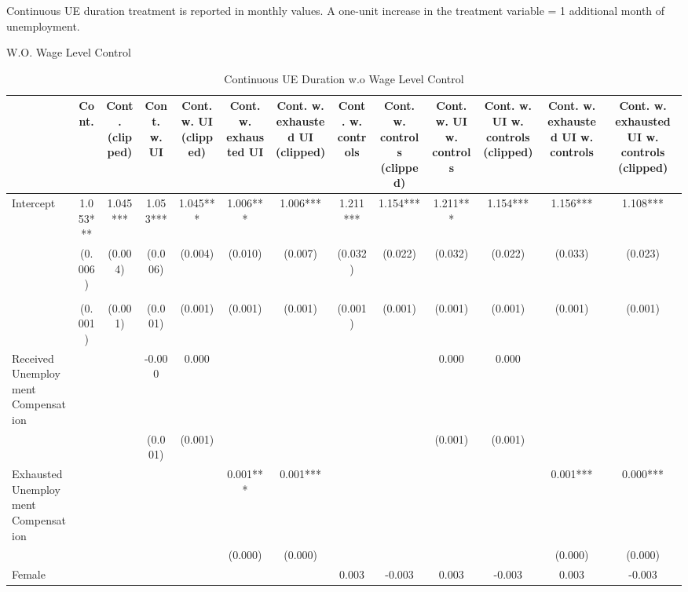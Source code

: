 \documentclass[
]{article}
\begin{document}
Continuous UE duration treatment is reported in monthly values. A
one-unit increase in the treatment variable = 1 additional month of
unemployment.

W.O. Wage Level Control

\begin{table}[t]
\caption{\label{tab:unnamed-chunk-28}Continuous UE Duration w.o Wage Level Control} 
\fontsize{12.0pt}{14.4pt}\selectfont
\begin{tabular*}{\linewidth}{@{\extracolsep{\fill}}lcccccccccccc}
\toprule
  & Cont. & Cont. (clipped) & Cont. w. UI & Cont. w. UI (clipped) & Cont. w. exhausted UI & Cont. w. exhausted UI (clipped) & Cont. w. controls & Cont. w. controls (clipped) & Cont. w. UI w. controls & Cont. w. UI w. controls (clipped) & Cont. w. exhausted UI w. controls & Cont. w. exhausted UI w. controls (clipped) \\ 
\midrule\addlinespace[2.5pt]
Intercept & 1.053*** & 1.045*** & 1.053*** & 1.045*** & 1.006*** & 1.006*** & 1.211*** & 1.154*** & 1.211*** & 1.154*** & 1.156*** & 1.108*** \\ 
 & (0.006) & (0.004) & (0.006) & (0.004) & (0.010) & (0.007) & (0.032) & (0.022) & (0.032) & (0.022) & (0.033) & (0.023) \\ 
{\cellcolor[HTML]{ADD8E6}{Unemployment Duration (Months)}} & {\cellcolor[HTML]{ADD8E6}{-0.007***}} & {\cellcolor[HTML]{ADD8E6}{-0.006***}} & {\cellcolor[HTML]{ADD8E6}{-0.007***}} & {\cellcolor[HTML]{ADD8E6}{-0.006***}} & {\cellcolor[HTML]{ADD8E6}{-0.005***}} & {\cellcolor[HTML]{ADD8E6}{-0.004***}} & {\cellcolor[HTML]{ADD8E6}{-0.006***}} & {\cellcolor[HTML]{ADD8E6}{-0.006***}} & {\cellcolor[HTML]{ADD8E6}{-0.006***}} & {\cellcolor[HTML]{ADD8E6}{-0.006***}} & {\cellcolor[HTML]{ADD8E6}{-0.004***}} & {\cellcolor[HTML]{ADD8E6}{-0.004***}} \\ 
 & (0.001) & (0.001) & (0.001) & (0.001) & (0.001) & (0.001) & (0.001) & (0.001) & (0.001) & (0.001) & (0.001) & (0.001) \\ 
Received Unemployment Compensation &  &  & -0.000 & 0.000 &  &  &  &  & 0.000 & 0.000 &  &  \\ 
 &  &  & (0.001) & (0.001) &  &  &  &  & (0.001) & (0.001) &  &  \\ 
Exhausted Unemployment Compensation &  &  &  &  & 0.001*** & 0.001*** &  &  &  &  & 0.001*** & 0.000*** \\ 
 &  &  &  &  & (0.000) & (0.000) &  &  &  &  & (0.000) & (0.000) \\ 
Female &  &  &  &  &  &  & 0.003 & -0.003 & 0.003 & -0.003 & 0.003 & -0.003 \\ 

\end{tabular*}
\end{table}
\end{document}
